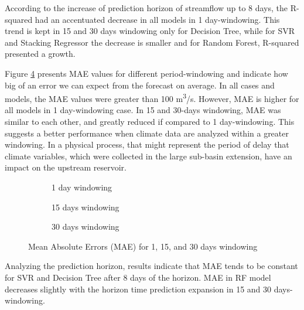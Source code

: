 \documentclass[12pt]{article}
\begin{document}
According to the increase of prediction horizon of streamflow up to 8 days, the R-squared had an accentuated decrease in all models in 1 day-windowing. This trend is kept in 15 and 30 days windowing only for Decision Tree, while for SVR and Stacking Regressor the decrease is smaller and for Random Forest, R-squared presented a growth.

Figure \ref{fig:sfigMAE} presents MAE values for different period-windowing and indicate how big of an error we can expect from the forecast on average. In all cases and models, the MAE values were greater than 100 m\textsuperscript{3}/s. However, MAE is higher for all models in 1 day-windowing case. In 15 and 30-days windowing, MAE was similar to each other, and greatly reduced if compared to 1 day-windowing. This suggests a better performance when climate data are analyzed within a greater windowing. In a physical process, that might represent the period of delay that climate variables, which were collected in the large sub-basin extension, have an impact on the upstream reservoir.

\begin{figure}[htbp]
    \centering
    \begin{subfigure}[b]{.49\textwidth}
        \centering
        
        \caption{1 day windowing}
        \label{fig:sfig1MAE}
    \end{subfigure}
    \begin{subfigure}[b]{.49\textwidth}
        \centering
        
        \caption{15 days windowing}
        \label{fig:sfig2MAE}
    \end{subfigure}
    \begin{subfigure}[b]{\textwidth}
        \centering
        
        \captionsetup{justification=justified,singlelinecheck=false}
        \caption{30 days windowing}
        \label{fig:sfig3MAE}
    \end{subfigure}
    \caption{Mean Absolute Errors (MAE) for  1,  15, and  30 days windowing}
    \label{fig:sfigMAE}
\end{figure}

Analyzing the prediction horizon, results indicate that MAE tends to be constant for SVR and Decision Tree after 8 days of the horizon. MAE in RF model decreases slightly with the horizon time prediction expansion in 15 and 30 days-windowing.
\end{document}
